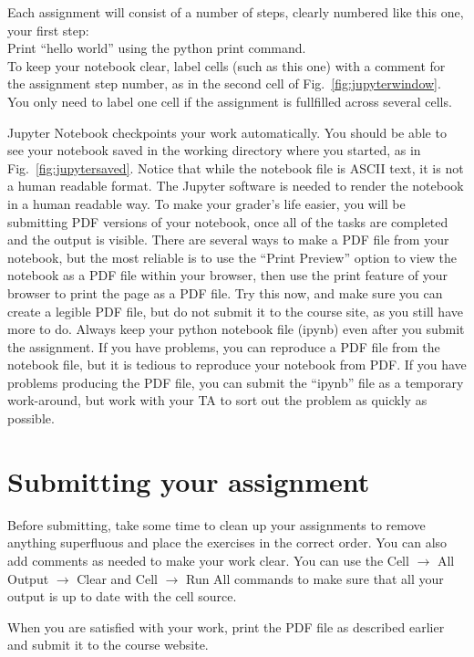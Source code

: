 Each assignment will consist of a number of steps, clearly numbered like this one, your first step:\\

\plot Print ``hello world'' using the python print command.\\

\noindent
To keep your notebook clear, label cells (such as this one) with a
comment for the assignment step number, as in the second cell of
Fig.~\ref{fig:jupyterwindow}.  You only need to label one cell if the
assignment is fullfilled across several cells.

Jupyter Notebook checkpoints your work automatically.  You should be
able to see your notebook saved in the working directory where you
started, as in Fig.~\ref{fig:jupytersaved}.  Notice that while the
notebook file is ASCII text, it is not a human readable format.  The
Jupyter software is needed to render the notebook in a human readable
way.  To make your grader's life easier, you will be submitting PDF
versions of your notebook, once all of the tasks are completed and the
output is visible.  There are several ways to make a PDF file from
your notebook, but the most reliable is to use the ``Print Preview''
option to view the notebook as a PDF file within your browser, then
use the print feature of your browser to print the page as a PDF file.
Try this now, and make sure you can create a legible PDF file, but do
not submit it to the course site, as you still have more to do.
Always keep your python notebook file (ipynb) even after you submit
the assignment.  If you have problems, you can reproduce a PDF file
from the notebook file, but it is tedious to reproduce your notebook
from PDF.  If you have problems producing the PDF file, you can submit
the ``ipynb'' file as a temporary work-around, but work with your TA
to sort out the problem as quickly as possible.

\section{Submitting your assignment}

Before submitting, take some time to clean up your assignments to
remove anything superfluous and place the exercises in the correct
order.  You can also add comments as needed to make your work clear.
You can use the Cell $\to$ All Output $\to$ Clear and Cell $\to$ Run
All commands to make sure that all your output is up to date with the
cell source.

When you are satisfied with your work, print the PDF file as described
earlier and submit it to the course website.









